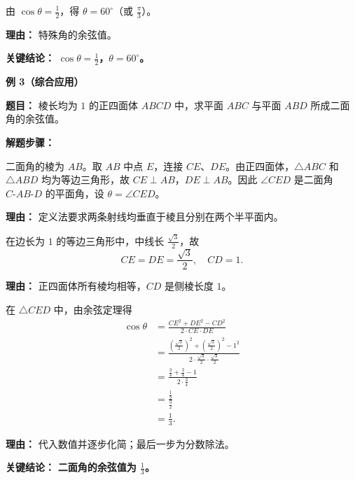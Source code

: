 \begin{examplebox}
\begin{description}[style=nextline, leftmargin=2.8em, labelsep=0.5em, itemsep=0.45em]
		\item[\textbf{第三步（求角）：}] 由 $\cos\theta=\frac12$，得 $\theta=60^\circ$（或 $\frac{\pi}{3}$）。
			\par\textbf{理由：}
			特殊角的余弦值。
	\end{description}

	\textbf{\textcolor{CExample}{关键结论：}}
	\textbf{$\cos\theta=\frac12$，$\theta=60^\circ$。}

	\medskip
	\textbf{\textcolor{CExample}{例 3（综合应用）}}

	\textbf{\textcolor{CExample}{题目：}}
	棱长均为 $1$ 的正四面体 $ABCD$ 中，求平面 $ABC$ 与平面 $ABD$ 所成二面角的余弦值。

	\textbf{\textcolor{CExample}{解题步骤：}}
	\begin{description}[style=nextline, leftmargin=2.8em, labelsep=0.5em, itemsep=0.45em]
		\item[\textbf{第一步（确定棱与平面角）：}] 二面角的棱为 $AB$。取 $AB$ 中点 $E$，连接 $CE$、$DE$。由正四面体，$\triangle ABC$ 和 $\triangle ABD$ 均为等边三角形，故 $CE\perp AB$，$DE\perp AB$。因此 $\angle CED$ 是二面角 $C\text{-}AB\text{-}D$ 的平面角，设 $\theta = \angle CED$。
			\par\textbf{理由：}
			定义法要求两条射线均垂直于棱且分别在两个半平面内。

		\item[\textbf{第二步（计算所需边长）：}] 在边长为 $1$ 的等边三角形中，中线长 $\frac{\sqrt3}{2}$，故
			\[
				CE = DE = \frac{\sqrt3}{2},\quad CD = 1.
			\]
			\par\textbf{理由：}
			正四面体所有棱均相等，$CD$ 是侧棱长度 $1$。

		\item[\textbf{第三步（余弦定理求角）：}] 在 $\triangle CED$ 中，由余弦定理得
			\[
				\begin{aligned}
					\cos\theta &= \frac{CE^2+DE^2-CD^2}{2\cdot CE\cdot DE} \\
					&= \frac{\left(\frac{\sqrt3}{2}\right)^2+\left(\frac{\sqrt3}{2}\right)^2-1^2}{2\cdot\frac{\sqrt3}{2}\cdot\frac{\sqrt3}{2}} \\
					&= \frac{\frac34+\frac34-1}{2\cdot\frac34} \\
					&= \frac{\frac12}{\frac32} \\
					&= \frac13.
			\end{aligned}
			\]
			\par\textbf{理由：}
			代入数值并逐步化简；最后一步为分数除法。
	\end{description}

	\textbf{\textcolor{CExample}{关键结论：}}
	\textbf{二面角的余弦值为 $\frac13$。}
\end{examplebox}

